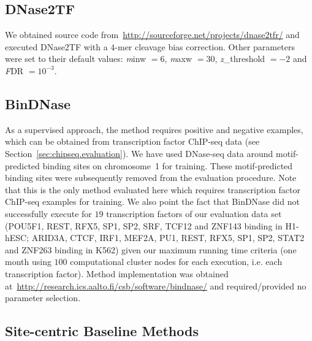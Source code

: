 \subsection{DNase2TF}
\label{sec:dnase2tf}

We obtained source code from~\url{http://sourceforge.net/projects/dnase2tfr/} and executed DNase2TF with a $4$-mer cleavage bias correction. Other parameters were set to their default values: {\emph minw} $= 6$, {\emph maxw} $= 30$, {\emph z\_threshold} $= -2$ and {\emph FDR} $= 10^{-3}$.

\subsection{BinDNase}
\label{sec:bindnase}

As a supervised approach, the method requires positive and negative examples, which can be obtained from transcription factor ChIP-seq data (see Section~\ref{sec:chipseq.evaluation}). We have used DNase-seq data around motif-predicted binding sites on chromosome~1 for training. These motif-predicted binding sites were subsequently removed from the evaluation procedure. Note that this is the only method evaluated here which requires transcription factor ChIP-seq examples for training. We also point the fact that BinDNase did not successfully execute for $19$ transcription factors of our evaluation data set (POU5F1, REST, RFX5, SP1, SP2, SRF, TCF12 and ZNF143 binding in H1-hESC; ARID3A, CTCF, IRF1, MEF2A, PU1, REST, RFX5, SP1, SP2, STAT2 and ZNF263 binding in K562) given our maximum running time criteria (one month using $100$ computational cluster nodes for each execution, i.e. each transcription factor). Method implementation was obtained at~\url{http://research.ics.aalto.fi/csb/software/bindnase/} and required/provided no parameter selection.

\subsection{Site-centric Baseline Methods}
\label{sec:sitecentric.baseline.methods}

